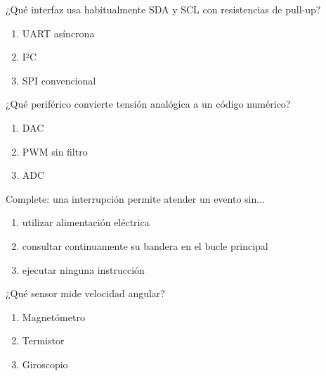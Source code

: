 \noindent\begin{minipage}{\linewidth}\setlength{\parskip}{4pt}\label{q:H-048}
¿Qué interfaz usa habitualmente SDA y SCL con resistencias de pull-up?
\begin{enumerate}[label=\Alph*),nosep]
\item UART asíncrona
\item I²C
\item SPI convencional
\end{enumerate}\end{minipage}\par\medskip

\noindent\begin{minipage}{\linewidth}\setlength{\parskip}{4pt}\label{q:H-049}
¿Qué periférico convierte tensión analógica a un código numérico?
\begin{enumerate}[label=\Alph*),nosep]
\item DAC
\item PWM sin filtro
\item ADC
\end{enumerate}\end{minipage}\par\medskip

\noindent\begin{minipage}{\linewidth}\setlength{\parskip}{4pt}\label{q:H-050}
Complete: una interrupción permite atender un evento sin...
\begin{enumerate}[label=\Alph*),nosep]
\item utilizar alimentación eléctrica
\item consultar continuamente su bandera en el bucle principal
\item ejecutar ninguna instrucción
\end{enumerate}\end{minipage}\par\medskip

\noindent\begin{minipage}{\linewidth}\setlength{\parskip}{4pt}\label{q:H-051}
¿Qué sensor mide velocidad angular?
\begin{enumerate}[label=\Alph*),nosep]
\item Magnetómetro
\item Termistor
\item Giroscopio
\end{enumerate}\end{minipage}\par\medskip

